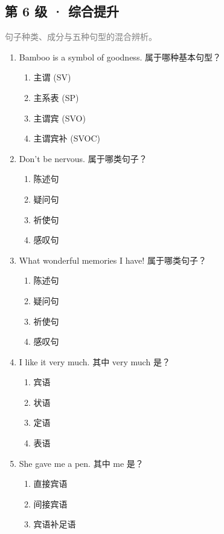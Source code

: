 \documentclass[11pt,a4paper]{ctexart}
\begin{document}
\subsection*{第 6 级 · 综合提升}
\noindent\textcolor{gray}{句子种类、成分与五种句型的混合辨析。}\par\smallskip
\begin{enumerate}[leftmargin=*,itemsep=4pt]
\item Bamboo is a symbol of goodness. 属于哪种基本句型？
\begin{enumerate}[label=\Alph*.,leftmargin=2em,itemsep=1pt,topsep=2pt]
\item 主谓 (SV)
\item 主系表 (SP)
\item 主谓宾 (SVO)
\item 主谓宾补 (SVOC)
\end{enumerate}
\item Don’t be nervous. 属于哪类句子？
\begin{enumerate}[label=\Alph*.,leftmargin=2em,itemsep=1pt,topsep=2pt]
\item 陈述句
\item 疑问句
\item 祈使句
\item 感叹句
\end{enumerate}
\item What wonderful memories I have! 属于哪类句子？
\begin{enumerate}[label=\Alph*.,leftmargin=2em,itemsep=1pt,topsep=2pt]
\item 陈述句
\item 疑问句
\item 祈使句
\item 感叹句
\end{enumerate}
\item I like it very much. 其中 very much 是？
\begin{enumerate}[label=\Alph*.,leftmargin=2em,itemsep=1pt,topsep=2pt]
\item 宾语
\item 状语
\item 定语
\item 表语
\end{enumerate}
\item She gave me a pen. 其中 me 是？
\begin{enumerate}[label=\Alph*.,leftmargin=2em,itemsep=1pt,topsep=2pt]
\item 直接宾语
\item 间接宾语
\item 宾语补足语

\end{enumerate}
\end{enumerate}
\end{document}
